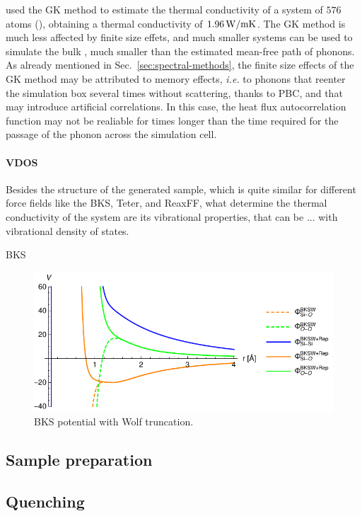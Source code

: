 \citet{McGaughey2004b} used the GK method to estimate the thermal conductivity of a system of $576$ atoms (\LE{$\rho=***$}), obtaining a thermal conductivity of $1.96\,\mathrm{W/mK}$. 
The GK method is much less affected by finite size effets, and much smaller systems can be used to simulate the bulk \cite{Schelling2002}, much smaller than the estimated mean-free path of phonons. As already mentioned in Sec.~\ref{sec:spectral-methods}, the finite size effects of the GK method may be attributed to memory effects, \emph{i.e.} to phonons that reenter the simulation box several times without scattering, thanks to PBC, and that may introduce artificial correlations. In this case, the heat flux autocorrelation function may not be realiable for times longer than the time required for the passage of the phonon across the simulation cell. 

\paragraph{VDOS}
Besides the structure of the generated sample, which is quite similar for different force fields like the BKS, Teter, and ReaxFF, what determine the thermal conductivity of the system are its vibrational properties, that can be ... with vibrational density of states.


BKS
\begin{figure}
    \centering
    \includegraphics[]{chapters/chapter6/figures/BKSW.pdf}
    \caption{BKS potential with Wolf truncation.}
    \label{fig:BKS-potential}
\end{figure}

\subsection{Sample preparation}


\subsection{Quenching}

